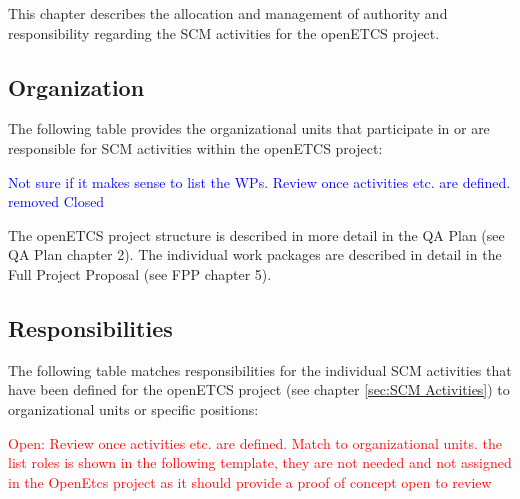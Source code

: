 \documentclass{template/openetcs_report}
\begin{document}
This chapter describes the allocation and management of authority and responsibility regarding the SCM activities for the openETCS project.


\subsection{Organization} %
\label{sec:Organization}

The following table provides the organizational units that participate in or are responsible for SCM activities within the openETCS project:

\textcolor{blue}{ Not sure if it makes sense to list the WPs. Review once activities etc. are defined. removed Closed}


The openETCS project structure is described in more detail in the QA Plan (see QA Plan chapter 2). The individual work packages are described in detail in the Full Project Proposal (see FPP chapter 5).


\subsection{Responsibilities} %
\label{sec:Responsibilities}

The following table matches responsibilities for the individual SCM activities that have been defined for the openETCS project (see chapter \ref{sec:SCM Activities}) to organizational units or specific positions:

\textcolor{red}{Open: Review once activities etc. are defined. Match to organizational units. the list roles is shown in the following template, they are not needed and not assigned in the OpenEtcs project as it should provide a proof of concept open to review}
\end{document}
